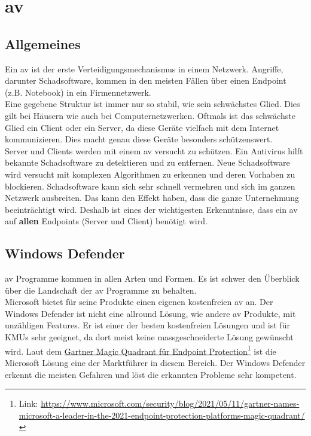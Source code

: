 \chapter{\acrlong{av}}
\section{Allgemeines}
Ein \acrfull{av} ist der erste Verteidigungsmechanismus in einem Netzwerk. Angriffe, darunter Schadsoftware, kommen in den meisten Fällen über einen Endpoint (z.B. Notebook) in ein Firmennetzwerk.\\

Eine gegebene Struktur ist immer nur so stabil, wie sein schwächstes Glied. Dies gilt bei Häusern wie auch bei Computernetzwerken.
Oftmals ist das schwächste Glied ein Client oder ein Server, da diese Geräte vielfach mit dem Internet kommunizieren.
Dies macht genau diese Geräte besonders schützenswert.\\

Server und Clients werden mit einem \acrlong{av} versucht zu schützen. Ein Antivirus hilft bekannte Schadsoftware zu detektieren und zu entfernen.
Neue Schadsoftware wird versucht mit komplexen Algorithmen zu erkennen und deren Vorhaben zu blockieren.
Schadsoftware kann sich sehr schnell vermehren und sich im ganzen Netzwerk ausbreiten. 
Das kann den Effekt haben, dass die ganze Unternehmung beeinträchtigt wird.
Deshalb ist eines der wichtigesten Erkenntnisse, dass ein \acrlong{av} auf \textbf{allen} Endpoints (Server und Client) benötigt wird.





\section{Windows Defender}
\acrfull{av} Programme kommen in allen Arten und Formen.
Es ist schwer den Überblick über die Landschaft der \acrlong{av} Programme zu behalten.\\


Microsoft bietet für seine Produkte einen eigenen kostenfreien \acrlong{av} an.
Der Windows Defender ist nicht eine allround Lösung, wie andere \acrshort{av} Produkte, mit unzähligen Features.
Er ist einer der besten kostenfreien Lösungen und ist für KMUs sehr geeignet, da dort meist keine massgeschneiderte Lösung gewünscht wird.
Laut dem \href{https://www.microsoft.com/security/blog/2021/05/11/gartner-names-microsoft-a-leader-in-the-2021-endpoint-protection-platforms-magic-quadrant/}{Gartner Magic Quadrant für Endpoint Protection}\footnote{Link: \href{https://www.microsoft.com/security/blog/2021/05/11/gartner-names-microsoft-a-leader-in-the-2021-endpoint-protection-platforms-magic-quadrant/}{https://www.microsoft.com/security/blog/2021/05/11/gartner-names-microsoft-a-leader-in-the-2021-endpoint-protection-platforms-magic-quadrant/}} ist die Microsoft Lösung eine der Marktführer in diesem Bereich.
Der Windows Defender erkennt die meisten Gefahren und löst die erkannten Probleme sehr kompetent.\\

